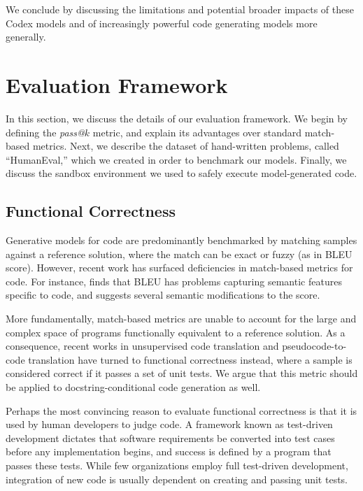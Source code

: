 We conclude by discussing the limitations and potential broader impacts of these Codex models and of increasingly powerful code generating models more generally.

\section{Evaluation Framework}
\label{sec:eval}

In this section, we discuss the details of our evaluation framework. We begin by defining the \textit{pass@$k$} metric, and explain its advantages over standard match-based metrics. Next, we describe the dataset of hand-written problems, called ``HumanEval,'' which we created in order to benchmark our models. Finally, we discuss the sandbox environment we used to safely execute model-generated code.

\subsection{Functional Correctness}
\label{sec:eval:correctness}

Generative models for code are predominantly benchmarked by matching samples against a reference solution, where the match can be exact or fuzzy (as in BLEU score). However, recent work has surfaced deficiencies in match-based metrics for code. For instance, \citet{ren2020codebleu} finds that BLEU has problems capturing semantic features specific to code, and suggests several semantic modifications to the score.

More fundamentally, match-based metrics are unable to account for the large and complex space of programs functionally equivalent to a reference solution. As a consequence, recent works in unsupervised code translation \citep{lachaux2020unsuptrans} and pseudocode-to-code translation \citep{kulal2019spoc} have turned to functional correctness instead, where a sample is considered correct if it passes a set of unit tests. We argue that this metric should be applied to docstring-conditional code generation as well.

Perhaps the most convincing reason to evaluate functional correctness is that it is used by human developers to judge code. A framework known as test-driven development dictates that software requirements be converted into test cases before any implementation begins, and success is defined by a program that passes these tests. While few organizations employ full test-driven development, integration of new code is usually dependent on creating and passing unit tests.

